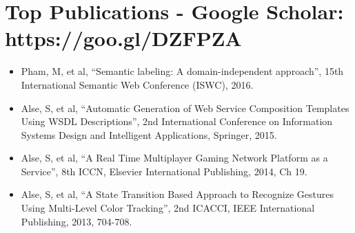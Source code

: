 \newcommand\textlcsc[1]{\textsc{\MakeTextLowercase{#1}}}
\section{Top Publications - \normalsize{Google Scholar: }\textup{https://goo.gl/DZFPZA}}
\begin{itemize}
\setlength\itemsep{-5pt}
\item Pham, M, et al, ``Semantic labeling: A domain-independent approach'', 15th International Semantic Web Conference (ISWC), 2016.
\item Alse, S, et al, ``Automatic Generation of Web Service Composition Templates Using WSDL Descriptions'', 2nd International Conference on Information Systems Design and Intelligent Applications, Springer, 2015.
\item Alse, S, et al, ``A Real Time Multiplayer Gaming Network Platform as a Service'', 8th ICCN, Elsevier International Publishing, 2014, Ch 19.
\item Alse, S, et al, ``A State Transition Based Approach to Recognize Gestures Using Multi-Level Color Tracking'', 2nd ICACCI, IEEE International Publishing, 2013, 704-708.
\end{itemize}
